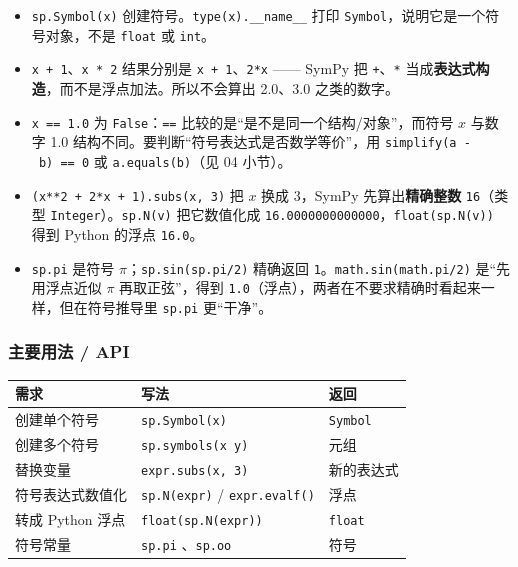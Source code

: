 \begin{itemize}
\tightlist
\item
  \texttt{sp.Symbol(\textquotesingle{}x\textquotesingle{})}
  创建符号。\texttt{type(x).\_\_name\_\_} 打印
  \texttt{Symbol}，说明它是一个符号对象，不是 \texttt{float} 或
  \texttt{int}。
\item
  \texttt{x\ +\ 1}、\texttt{x\ *\ 2} 结果分别是
  \texttt{x\ +\ 1}、\texttt{2*x} ------ SymPy 把 \texttt{+}、\texttt{*}
  当成\textbf{表达式构造}，而不是浮点加法。所以不会算出 2.0、3.0
  之类的数字。
\item
  \texttt{x\ ==\ 1.0} 为 \texttt{False}：\texttt{==}
  比较的是``是不是同一个结构/对象''，而符号 \(x\) 与数字 1.0
  结构不同。要判断``符号表达式是否数学等价''，用
  \texttt{simplify(a\ -\ b)\ ==\ 0} 或 \texttt{a.equals(b)}（见 04
  小节）。
\item
  \texttt{(x**2\ +\ 2*x\ +\ 1).subs(x,\ 3)} 把 \(x\) 换成 3，SymPy
  先算出\textbf{精确整数} \texttt{16}（类型
  \texttt{Integer}）。\texttt{sp.N(v)} 把它数值化成
  \texttt{16.0000000000000}，\texttt{float(sp.N(v))} 得到 Python 的浮点
  \texttt{16.0}。
\item
  \texttt{sp.pi} 是符号 \(\pi\)；\texttt{sp.sin(sp.pi/2)} 精确返回
  \texttt{1}。\texttt{math.sin(math.pi/2)} 是``先用浮点近似 \(\pi\)
  再取正弦''，得到
  \texttt{1.0}（浮点），两者在不要求精确时看起来一样，但在符号推导里
  \texttt{sp.pi} 更``干净''。
\end{itemize}

\subsubsection{主要用法 / API}\label{ux4e3bux8981ux7528ux6cd5-api-11}

{\def\LTcaptype{none} %
\begin{longtable}[]{@{}lll@{}}
\toprule\noalign{}
需求 & 写法 & 返回 \\
\midrule\noalign{}
\endhead
\bottomrule\noalign{}
\endlastfoot
创建单个符号 & \texttt{sp.Symbol(\textquotesingle{}x\textquotesingle{})}
& \texttt{Symbol} \\
创建多个符号 &
\texttt{sp.symbols(\textquotesingle{}x\ y\textquotesingle{})} & 元组 \\
替换变量 & \texttt{expr.subs(x,\ 3)} & 新的表达式 \\
符号表达式数值化 & \texttt{sp.N(expr)} / \texttt{expr.evalf()} & 浮点 \\
转成 Python 浮点 & \texttt{float(sp.N(expr))} & \texttt{float} \\
符号常量 & \texttt{sp.pi} 、\texttt{sp.oo} & 符号 \\
\end{longtable}
}


